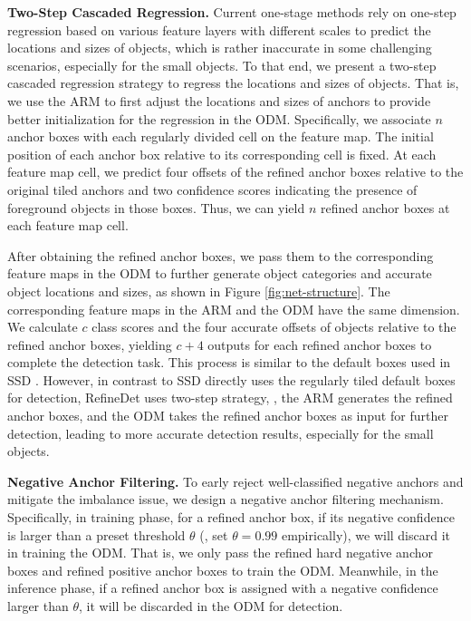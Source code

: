 \documentclass[10pt,twocolumn,letterpaper]{article}
\begin{document}
{\noindent \textbf{Two-Step Cascaded Regression.}}
Current one-stage methods \cite{DBLP:journals/corr/FuLRTB17,DBLP:conf/cvpr/KongSYLLC17,DBLP:conf/eccv/LiuAESRFB16} rely on one-step regression based on various feature layers with different scales to predict the locations and sizes of objects, which is rather inaccurate in some challenging scenarios, especially for the small objects. To that end, we present a two-step cascaded regression strategy to regress the locations and sizes of objects. That is, we use the ARM to first adjust the locations and sizes of anchors to provide better initialization for the regression in the ODM. Specifically, we associate $n$ anchor boxes with each regularly divided cell on the feature map. The initial position of each anchor box relative to its corresponding cell is fixed. At each feature map cell, we predict four offsets of the refined anchor boxes relative to the original tiled anchors and two confidence scores indicating the presence of foreground objects in those boxes. Thus, we can yield $n$ refined anchor boxes at each feature map cell.

After obtaining the refined anchor boxes, we pass them to the corresponding feature maps in the ODM to further generate object categories and accurate object locations and sizes, as shown in Figure \ref{fig:net-structure}. The corresponding feature maps in the ARM and the ODM have the same dimension. We calculate $c$ class scores and the four accurate offsets of objects relative to the refined anchor boxes, yielding $c+4$ outputs for each refined anchor boxes to complete the detection task. This process is similar to the default boxes used in SSD \cite{DBLP:conf/eccv/LiuAESRFB16}. However, in contrast to SSD \cite{DBLP:conf/eccv/LiuAESRFB16} directly uses the regularly tiled default boxes for detection, RefineDet uses two-step strategy, \ie, the ARM generates the refined anchor boxes, and the ODM takes the refined anchor boxes as input for further detection, leading to more accurate detection results, especially for the small objects.


{\noindent \textbf{Negative Anchor Filtering.}}
To early reject well-classified negative anchors and mitigate the imbalance issue, we design a negative anchor filtering mechanism. Specifically, in training phase, for a refined anchor box, if its negative confidence is larger than a preset threshold $\theta$ (\ie, set $\theta=0.99$ empirically), we will discard it in training the ODM. That is, we only pass the refined hard negative anchor boxes and refined positive anchor boxes to train the ODM. Meanwhile, in the inference phase, if a refined anchor box is assigned with a negative confidence larger than $\theta$, it will be discarded in the ODM for detection.
\end{document}

